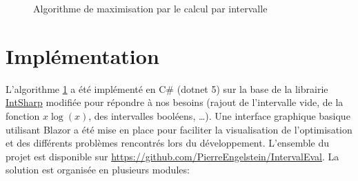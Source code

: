 \begin{figure}[H]
    \begin{algorithm}[H]
        \SetAlgoLined
      \end{algorithm}

    \caption{Algorithme de maximisation par le calcul par intervalle}
    \label{fig:algomaxim}
\end{figure}

\section{Implémentation}

L'algorithme \ref{fig:algomaxim} a été implémenté en C\# (dotnet 5) sur la base de la librairie \href{https://github.com/selmaohneh/IntSharp}{IntSharp} modifiée pour répondre à nos besoins (rajout de l'intervalle vide, de la fonction $x\log(x)$, des intervalles booléens, \dots). Une interface graphique basique utilisant Blazor a été mise en place pour faciliter la visualisation de l'optimisation et des différents problèmes rencontrés lors du développement. L'ensemble du projet est disponible sur \url{https://github.com/PierreEngelstein/IntervalEval}. La solution est organisée en plusieurs modules:


